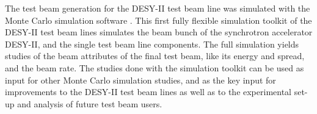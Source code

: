 The test beam generation for the DESY-II test beam line was simulated with the Monte Carlo simulation software \slic. This first fully flexible simulation toolkit of the DESY-II test beam lines simulates the beam bunch of the synchrotron accelerator DESY-II, and the single test beam line components. The full simulation yields studies of the beam attributes of the final test beam, like its energy and spread, and the beam rate. The studies done with the simulation toolkit can be used as input for other Monte Carlo simulation studies, and as the key input for improvements to the DESY-II test beam lines as well as to the experimental set-up and analysis of future test beam users. 